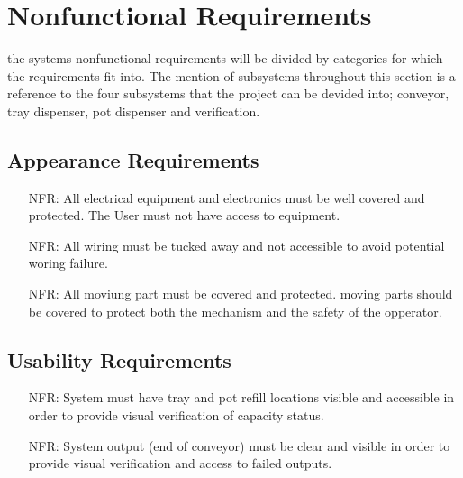 \documentclass[12pt]{article}
\newcounter{nfrnum} %
\begin{document}
  
  
  
  \section{Nonfunctional Requirements}
  the systems nonfunctional requirements will be divided by categories for which the requirements fit into. The mention of subsystems
  throughout this section is a reference to the four subsystems that the project can be devided into; conveyor, tray dispenser, pot dispenser and verification.
  
  \subsection{Appearance Requirements}

  \noindent 
  \begin{itemize}
  
  \item[NFR\refstepcounter{nfrnum}\thenfrnum \label{NFR_Accuracy}:]
    All electrical equipment and electronics must be well covered and protected. The User must not have access to equipment.
  
  \item[NFR\refstepcounter{nfrnum}\thenfrnum \label{NFR_Usability}:]
    All wiring must be tucked away and not accessible to avoid potential woring failure.
  
  \item[NFR\refstepcounter{nfrnum}\thenfrnum \label{NFR_Maintainability}:]
    All moviung part must be covered and protected. moving parts should be covered to protect both the mechanism and the safety of the opperator.

  \end{itemize}
  
  \subsection{Usability Requirements}

  \noindent \begin{itemize}
  
  \item[NFR\refstepcounter{nfrnum}\thenfrnum \label{NFR_Portability1}:]
  System must have tray and pot refill locations visible and accessible in order to provide visual verification of capacity status.
  
  \item[NFR\refstepcounter{nfrnum}\thenfrnum \label{NFR_Portability2}:]
  System output (end of conveyor) must be clear and visible in order to provide visual verification and access to failed outputs.
  \end{itemize}
\end{document}
